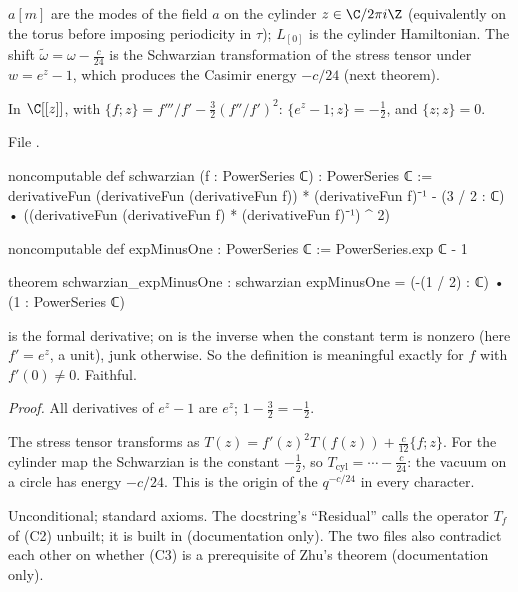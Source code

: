 \begin{physics}
$a[m]$ are the modes of the field $a$ on the cylinder $z\in\C/2\pi i\Z$ (equivalently on the torus before imposing periodicity
in $\tau$); $L_{[0]}$ is the cylinder Hamiltonian. The shift $\tilde\omega = \omega - \frac c{24}$ is the Schwarzian
transformation of the stress tensor under $w = e^z - 1$, which produces the Casimir energy $-c/24$ (next theorem).
\end{physics}

\begin{theorem}\label{l14:thm:schwarzian}
In $\C[[z]]$, with $\{f;z\} = f'''/f' - \frac32(f''/f')^2$: $\{e^z-1;z\} = -\frac12$, and $\{z;z\} = 0$.
\end{theorem}
\noindent File .
\begin{leancode}
noncomputable def schwarzian (f : PowerSeries ℂ) : PowerSeries ℂ :=
  derivativeFun (derivativeFun (derivativeFun f)) * (derivativeFun f)⁻¹
    - (3 / 2 : ℂ) • ((derivativeFun (derivativeFun f) * (derivativeFun f)⁻¹) ^ 2)

noncomputable def expMinusOne : PowerSeries ℂ := PowerSeries.exp ℂ - 1

theorem schwarzian_expMinusOne :
    schwarzian expMinusOne = (-(1 / 2) : ℂ) • (1 : PowerSeries ℂ)
\end{leancode}
\begin{dictionary}
 is the formal derivative;  on  is the inverse when the constant term is
nonzero (here $f' = e^z$, a unit), junk otherwise. So the definition is meaningful exactly for $f$ with $f'(0)\neq0$.
Faithful.
\end{dictionary}
\noindent\emph{Proof.} All derivatives of $e^z-1$ are $e^z$; $1 - \frac32 = -\frac12$.
\begin{physics}
The stress tensor transforms as $T(z) = f'(z)^2T(f(z)) + \frac{c}{12}\{f;z\}$. For the cylinder map the Schwarzian is the
constant $-\frac12$, so $T_{\text{cyl}} = \cdots - \frac c{24}$: the vacuum on a circle has energy $-c/24$. This is the origin
of the $q^{-c/24}$ in every character.
\end{physics}
\begin{status}
Unconditional; standard axioms. The docstring's ``Residual'' calls the operator $T_f$ of (C2) unbuilt; it is built in
 (documentation only). The two files also contradict each other on whether (C3) is a prerequisite of Zhu's theorem
(documentation only).
\end{status}

